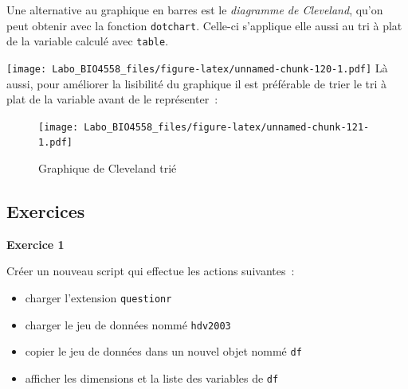 \documentclass[12pt,]{book}
\newenvironment{Shaded}{\begin{snugshade}}{\end{snugshade}}
\newcommand{\KeywordTok}[1]{\textcolor[rgb]{0.13,0.29,0.53}{\textbf{#1}}}
\newcommand{\NormalTok}[1]{#1}
\newcommand{\OperatorTok}[1]{\textcolor[rgb]{0.81,0.36,0.00}{\textbf{#1}}}
\providecommand{\tightlist}{%
  \setlength{\itemsep}{0pt}\setlength{\parskip}{0pt}}
\begin{document}
Une alternative au graphique en barres est le \emph{diagramme de Cleveland}, qu'on peut obtenir avec la fonction \texttt{dotchart}. Celle-ci s'applique elle aussi au tri à plat de la variable calculé avec \texttt{table}.

\begin{Shaded}
\end{Shaded}

\texttt{[image: Labo\_BIO4558\_files/figure-latex/unnamed-chunk-120-1.pdf]}
Là aussi, pour améliorer la lisibilité du graphique il est préférable de trier le tri à plat de la variable avant de le représenter~:

\begin{Shaded}
\end{Shaded}

\begin{figure}
\centering
\texttt{[image: Labo\_BIO4558\_files/figure-latex/unnamed-chunk-121-1.pdf]}
\caption{\label{fig:unnamed-chunk-121}Graphique de Cleveland trié}
\end{figure}

\hypertarget{ex-introR-univ}{%
\subsection{Exercices}\label{ex-introR-univ}}

\textbf{Exercice 1}

Créer un nouveau script qui effectue les actions suivantes~:

\begin{itemize}
\tightlist
\item
  charger l'extension \texttt{questionr}
\item
  charger le jeu de données nommé \texttt{hdv2003}
\item
  copier le jeu de données dans un nouvel objet nommé \texttt{df}
\item
  afficher les dimensions et la liste des variables de \texttt{df}
\end{itemize}
\end{document}
